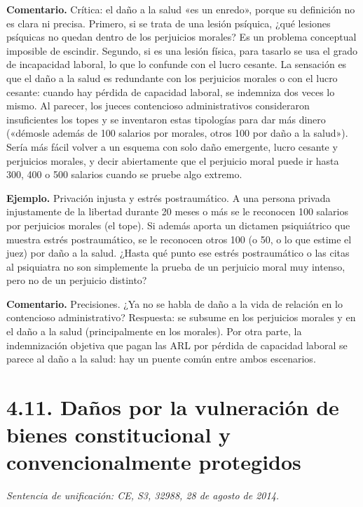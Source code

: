 \begin{comentario}
\textcolor[HTML]{8A6D3B}{\textbf{Comentario. }}Crítica: el daño a la salud «es un enredo», porque su definición no es clara ni precisa. Primero, si se trata de una lesión psíquica, ¿qué lesiones psíquicas no quedan dentro de los perjuicios morales? Es un problema conceptual imposible de escindir. Segundo, si es una lesión física, para tasarlo se usa el grado de incapacidad laboral, lo que lo confunde con el lucro cesante. La sensación es que el daño a la salud es redundante con los perjuicios morales o con el lucro cesante: cuando hay pérdida de capacidad laboral, se indemniza dos veces lo mismo. Al parecer, los jueces contencioso administrativos consideraron insuficientes los topes y se inventaron estas tipologías para dar más dinero («démosle además de 100 salarios por morales, otros 100 por daño a la salud»). Sería más fácil volver a un esquema con solo daño emergente, lucro cesante y perjuicios morales, y decir abiertamente que el perjuicio moral puede ir hasta 300, 400 o 500 salarios cuando se pruebe algo extremo.
\end{comentario}
\begin{ejemplo}
\textcolor[HTML]{4F6228}{\textbf{Ejemplo. }}Privación injusta y estrés postraumático. A una persona privada injustamente de la libertad durante 20 meses o más se le reconocen 100 salarios por perjuicios morales (el tope). Si además aporta un dictamen psiquiátrico que muestra estrés postraumático, se le reconocen otros 100 (o 50, o lo que estime el juez) por daño a la salud. ¿Hasta qué punto ese estrés postraumático o las citas al psiquiatra no son simplemente la prueba de un perjuicio moral muy intenso, pero no de un perjuicio distinto?
\end{ejemplo}
\begin{comentario}
\textcolor[HTML]{8A6D3B}{\textbf{Comentario. }}Precisiones. ¿Ya no se habla de daño a la vida de relación en lo contencioso administrativo? Respuesta: se subsume en los perjuicios morales y en el daño a la salud (principalmente en los morales). Por otra parte, la indemnización objetiva que pagan las ARL por pérdida de capacidad laboral se parece al daño a la salud: hay un puente común entre ambos escenarios.
\end{comentario}
\section{4.11. Daños por la vulneración de bienes constitucional y convencionalmente protegidos}
{\small \textcolor[HTML]{6B6B6B}{\textit{Sentencia de unificación: CE, S3, 32988, 28 de agosto de 2014.}}}

